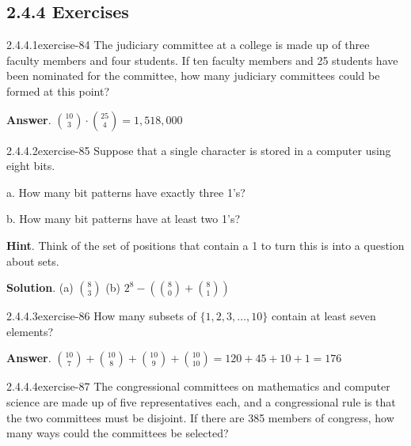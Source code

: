 \documentclass[twoside,10pt,]{book}
\numberwithin{equation}{section}
\begin{document}
\subsection*{2.4.4 Exercises}
\begin{divisionsolution}{2.4.4.1}{}{exercise-84}%
\hypertarget{p-806}{}%
The judiciary committee at a college is made up of three faculty members and four students. If ten faculty members and 25 students have been nominated for the committee, how many judiciary committees could be formed at this point?%
\par\smallskip%
\noindent\textbf{Answer}.\quad%
\hypertarget{p-807}{}%
\(\binom{10}{3}\cdot \binom{25}{4}=1,518,000\)%
\end{divisionsolution}%
\begin{divisionsolution}{2.4.4.2}{}{exercise-85}%
\hypertarget{p-808}{}%
Suppose that a single character is stored in a computer using eight bits.%
\par
\hypertarget{p-809}{}%
a. How many bit patterns have exactly three 1's?%
\par
\hypertarget{p-810}{}%
b. How many bit patterns have at least two 1's?%
\par\smallskip%
\noindent\textbf{Hint}.\quad%
\hypertarget{p-811}{}%
Think of the set of positions that contain a 1 to turn this is into a question about sets.%
\par\smallskip%
\noindent\textbf{Solution}.\quad%
\hypertarget{p-812}{}%
(a) \(\binom{8}{3}\) (b) \(2^8-(\binom{8}{0}+\binom{8}{1})\)%
\end{divisionsolution}%
\begin{divisionsolution}{2.4.4.3}{}{exercise-86}%
\hypertarget{p-813}{}%
How many subsets of \(\{1, 2, 3, \dots , 10\}\) contain at least seven elements?%
\par\smallskip%
\noindent\textbf{Answer}.\quad%
\hypertarget{p-814}{}%
\(\binom{10}{7} +\binom{10}{8} +\binom{10}{9} +\binom{10}{10}= 120+45+10+1=176 \)%
\end{divisionsolution}%
\begin{divisionsolution}{2.4.4.4}{}{exercise-87}%
\hypertarget{p-815}{}%
The congressional committees on mathematics and computer science are made up of five representatives each, and a congressional rule is that the two committees must be disjoint. If there are 385 members of congress, how many ways could the committees be selected?%
\end{divisionsolution}%
\end{document}
